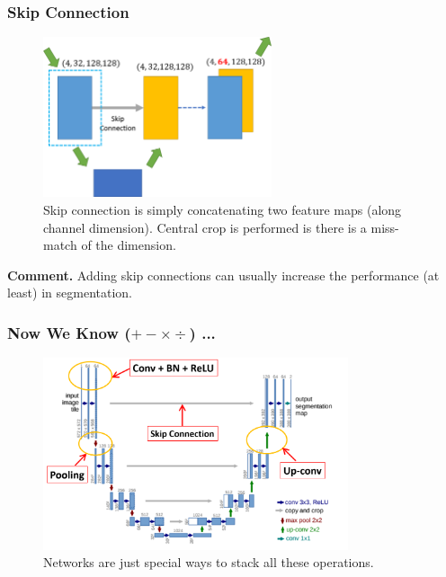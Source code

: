 \documentclass[10pt]{beamer}
\begin{document}
\begin{frame}
	\frametitle{Skip Connection}
	\begin{figure}[H]
	\centerline{
		\includegraphics[width=0.6\textwidth]{skip.png}
	}
	\caption{Skip connection is simply concatenating two feature maps (along channel dimension). Central crop is performed is there is a miss-match of the dimension.}
	\end{figure}	
\vskip -0.2in 
	\textbf{Comment.} Adding skip connections can usually increase the performance (at least) in segmentation.
\end{frame}

\begin{frame}
\frametitle{Now We Know ($+-\times \div$) ...}
	\begin{figure}[H]
	\centerline{
		\includegraphics[width=0.8\textwidth]{unet_detailed.png}
	}
	\caption{Networks are just special ways to stack all these operations.}
\end{figure}
\end{frame}
\end{document}
